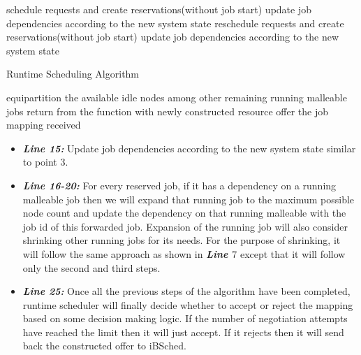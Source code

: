 \setcounter{AlgoLine}{0}
\begin{algorithm}[!htbp]
 \DontPrintSemicolon
 schedule requests and create reservations(without job start)\;
 update job dependencies according to the new system state\;
 reschedule requests and create reservations(without job start)\;
 update job dependencies according to the new system state\;
 \caption{Runtime Scheduling Algorithm}
 \label{algo:5}
\end{algorithm}
\pagebreak
\begin{algorithm}[!t]
 \DontPrintSemicolon
 equipartition the available idle nodes among other remaining running malleable jobs\;
 return from the function with newly constructed resource offer the job mapping received\;
\end{algorithm}
\begin{itemize}
\item \textbf{\textit{Line 15:}} Update job dependencies according to the new system state similar to point $3$.
\item \textbf{\textit{Line 16-20:}} For every reserved job, if it has a dependency on a running malleable job then we will expand that running job to the maximum possible node count and update the dependency on that running malleable with the job id of this forwarded job. Expansion of the running job will also consider shrinking other running jobs for its needs. For the purpose of shrinking, it will follow the same approach as shown in \textbf{\textit{Line $7$}} except that it will follow only the second and third steps.
\item \textbf{\textit{Line 25:}} Once all the previous steps of the algorithm have been completed, runtime scheduler will finally decide whether to accept or reject the mapping based on some decision making logic. If the number of negotiation attempts have reached the limit then it will just accept. If it rejects then it will send back the constructed offer to iBSched.
\end{itemize}
